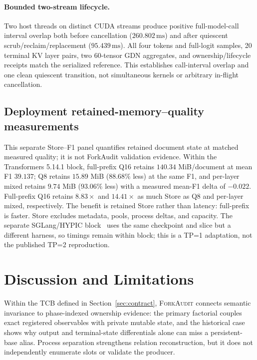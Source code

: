\documentclass{article}
\newcommand{\method}{\textsc{ForkAudit}}
\begin{document}
\paragraph{Bounded two-stream lifecycle.}
Two host threads on distinct CUDA streams produce positive full-model-call
interval overlap both before cancellation ($260.802\,\mathrm{ms}$) and after
quiescent scrub/reclaim/replacement ($95.439\,\mathrm{ms}$).  All four tokens
and full-logit samples, 20 terminal KV layer pairs, two 60-tensor GDN
aggregates, and ownership/lifecycle receipts match the serialized reference.
This establishes call-interval overlap and one clean quiescent transition, not
simultaneous kernels or arbitrary in-flight cancellation.

\FloatBarrier
\subsection{Deployment retained-memory--quality measurements}

This separate Store--F1 panel quantifies retained document state at matched
measured quality; it is not ForkAudit validation evidence.  Within the
Transformers 5.14.1 block, full-prefix Q16 retains $140.34$ MiB/document at mean
F1 $39.137$; Q8 retains $15.89$ MiB ($88.68\%$ less) at the same F1, and
per-layer mixed retains $9.74$ MiB ($93.06\%$ less) with a measured mean-F1
delta of $-0.022$.  Full-prefix Q16 retains $8.83\times$ and $14.41\times$ as
much Store as Q8 and per-layer mixed, respectively.  The benefit is retained
Store rather than latency: full-prefix is faster.
Store excludes metadata, pools, process deltas, and capacity.  The separate
SGLang/HYPIC block~\citep{liu2026hypic} uses the same checkpoint and slice but a
different harness, so timings remain within block; this is a TP=1 adaptation,
not the published TP=2 reproduction.


\FloatBarrier

\section{Discussion and Limitations}
\label{sec:limitations}

Within the TCB defined in Section~\ref{sec:contract}, \method{} connects
semantic invariance to phase-indexed ownership evidence: the primary factorial couples exact registered
observables with private mutable state, and the historical case shows why
output and terminal-state differentials alone can miss a persistent-base
alias.  Process separation strengthens relation reconstruction, but it does
not independently enumerate slots or validate the producer.
\end{document}
